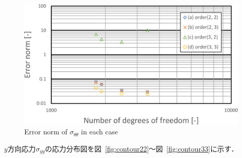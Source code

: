 \newpage

\begin{figure}[htbp]
  \centering
  \includegraphics[keepaspectratio, scale=0.5]
  {fig/result_data_etc/s-iga01/theta-crop.pdf}
  \caption{Error norm of $\sigma_{\theta\theta}$ in each case}
  \label{fig:ERNt}
\end{figure}

$y$方向応力$\sigma_{yy}$の応力分布図を図~\ref{fig:contour22}～図~\ref{fig:contour33}に示す．

